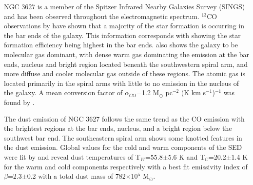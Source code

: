 NGC 3627 is a member of the Spitzer Infrared Nearby Galaxies Survey (SINGS) \citep{kennicutt2003} and has been observed throughout the electromagnetic spectrum.  $^{13}$CO observations by \cite{watanabe2011} have shown that a majority of the star formation is occurring in the bar ends of the galaxy.  This information corresponds with \cite{warren2010} showing the star formation efficiency being highest in the bar ends.  \cite{warren2010} also shows the galaxy to be molecular gas dominant, with dense warm gas dominating the emission at the bar ends, nucleus and bright region located beneath the southwestern spiral arm, and more diffuse and cooler molecular gas outside of these regions.  The atomic gas is located primarily in the spiral arms with little to no emission in the nucleus of the galaxy.  A mean conversion factor of $\alpha_{CO}$=1.2 M$_\odot$ pc$^{-2}$ (K km s$^{-1}$)$^{-1}$ was found by \cite{sandstrom2013}.

The dust emission of NGC 3627 follows the same trend as the CO emission with the brightest regions at the bar ends, nucleus, and a bright region below the southwest bar end.  The southeastern spiral arm shows some knotted features in the dust emission.  Global values for the cold and warm components of the SED were fit by \cite{galametz2012} and reveal dust temperatures of T$_W$=55.8$\pm$5.6 K and T$_C$=20.2$\pm$1.4 K for the warm and cold components respectively with a best fit emissivity index of $\beta$=2.3$\pm$0.2 with a total dust mass of 782$\times$10$^5$ M$_\odot$.